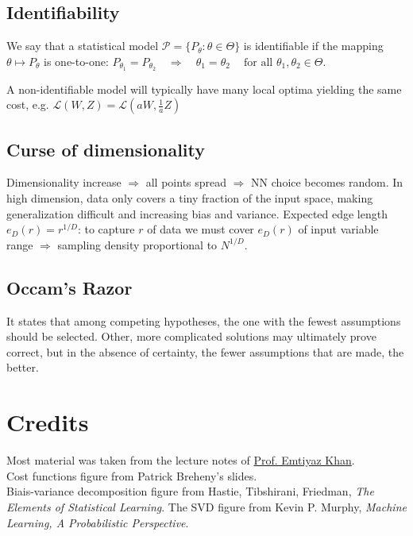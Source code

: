 \documentclass[10pt,a4paper,landscape]{article}
\begin{document}
\begin{multicols*}{4}
\subsection{Identifiability}
We say that a statistical model $\mathcal{P} = \{P_\theta: \theta \in \Theta\}$ is identifiable if the mapping $\theta \mapsto P_\theta$ is one-to-one:
$P_{\theta_1}=P_{\theta_2} \quad\Rightarrow\quad \theta_1=\theta_2 \quad\ \text{for all } \theta_1,\theta_2\in\Theta.$

A non-identifiable model will typically have many local optima yielding the same cost, e.g. $\mathcal{L}(W, Z) = \mathcal{L}(aW, \frac{1}{a} Z)$

\subsection{Curse of dimensionality}
Dimensionality increase $\Rightarrow$ all points spread $\Rightarrow$ NN choice becomes random. 
In high dimension, data only covers a tiny fraction of the input space, making generalization difficult and increasing bias and variance.
Expected edge length $e_D(r) = r^{1/D}$: to capture $r$ of data we must cover $e_D(r)$ of input variable range $\Rightarrow$ sampling density proportional to $N^{1/D}$.





\subsection{Occam's Razor}
It states that among competing hypotheses, the one with the fewest assumptions should be selected. Other, more complicated solutions may ultimately prove correct, but in the absence of certainty, the fewer assumptions that are made, the better.



\section{Credits}
Most material was taken from the lecture notes of \href{http://people.epfl.ch/228491}{Prof. Emtiyaz Khan}.\\
Cost functions figure from Patrick Breheny's slides.\\
Biais-variance decomposition figure from Hastie, Tibshirani, Friedman, \textit{The Elements of Statistical Learning}.
The SVD figure from Kevin P. Murphy, \textit{Machine Learning, A Probabilistic Perspective}.


\end{multicols*}
\end{document}
